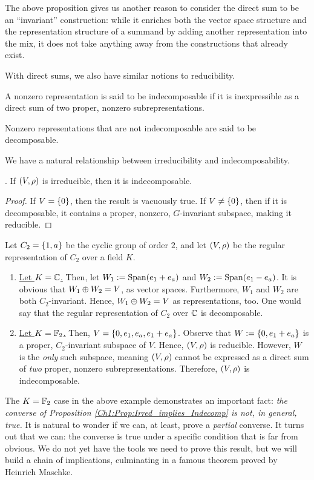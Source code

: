 The above proposition gives us another reason to consider the direct sum to be an ``invariant'' construction: while it enriches both the vector space structure and the representation structure of a summand by adding another representation into the mix, it does not take anything away from the constructions that already exist.

With direct sums, we also have similar notions to reducibility.

\begin{boxdefinition}[Indecomposability]
    A nonzero representation is said to be indecomposable if it is inexpressible as a direct sum of two proper, nonzero subrepresentations.
\end{boxdefinition}
Nonzero representations that are not indecomposable are said to be decomposable.

We have a natural relationship between irreducibility and indecomposability.

\begin{proposition}\label{Ch1:Prop:Irred_implies_Indecomp}
    . If $\left( V, \rho \right)$ is irreducible, then it is indecomposable.
\end{proposition}
\begin{proof}
    If $V = \left\{ 0 \right\}$, then the result is vacuously true. If $V \neq \left\{ 0 \right\}$, then if it is decomposable, it contains a proper, nonzero, $G$-invariant subspace, making it reducible.
\end{proof}

\begin{boxexample}
    Let $C_2 = \left\{ 1, a \right\}$ be the cyclic group of order $2$, and let $\left( V, \rho \right)$ be the regular representation of $C_2$ over a field $K$.
    \begin{enumerate}
        \item \underline{Let $K = \mathbb{C}$.} Then, let $W_1 := \operatorname{Span}\!\left( e_1 + e_a \right)$ and $W_2 := \operatorname{Span}\!\left( e_1 - e_a \right)$. It is obvious that $W_1 \oplus W_2 = V$, as vector spaces. Furthermore, $W_1$ and $W_2$ are both $C_2$-invariant. Hence, $W_1 \oplus W_2 = V$ as representations, too. One would say that the regular representation of $C_2$ over $\mathbb{C}$ is decomposable.
        \item \underline{Let $K = \mathbb{F}_2$.} Then, $V = \left\{ 0, e_1, e_a, e_1 + e_a \right\}$. Observe that $W := \left\{ 0, e_1 + e_a \right\}$ is a proper, $C_2$-invariant subspace of $V$. Hence, $\left( V, \rho \right)$ is reducible. However, $W$ is the \textit{only} such subspace, meaning $\left( V, \rho \right)$ cannot be expressed as a direct sum of \textit{two} proper, nonzero subrepresentations. Therefore, $\left( V, \rho \right)$ is indecomposable. %
    \end{enumerate}
\end{boxexample}
The $K = \mathbb{F}_2$ case in the above example demonstrates an important fact: \textit{the converse of Proposition \ref{Ch1:Prop:Irred_implies_Indecomp} is not, in general, true.} It is natural to wonder if we can, at least, prove a \textit{partial} converse. It turns out that we can: the converse is true under a specific condition that is far from obvious. We do not yet have the tools we need to prove this result, but we will build a chain of implications, culminating in a famous theorem proved by Heinrich Maschke.

